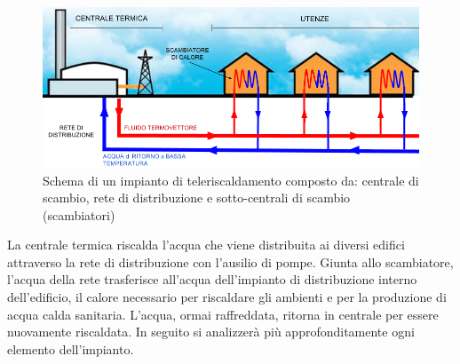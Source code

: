 \documentclass[laurea,oneside,11pt]{USiena_tesiLM}
\begin{document}
\begin{figure}[h]
\begin{center}
\includegraphics[width=1.0\textwidth]{figure/schema_impianto1}
\caption{Schema di un impianto di teleriscaldamento composto da: centrale di scambio, rete di distribuzione e sotto-centrali di scambio (scambiatori)}
\label{fig:schema1}
\end{center}
\end{figure}

La centrale termica riscalda l'acqua che viene distribuita ai diversi edifici attraverso la rete di distribuzione con l'ausilio di pompe. Giunta allo scambiatore, l'acqua della rete trasferisce all'acqua dell'impianto di distribuzione interno dell'edificio, il calore necessario per riscaldare gli ambienti e per la produzione di acqua calda sanitaria. L'acqua, ormai raffreddata, ritorna in centrale per essere nuovamente riscaldata. 
In seguito si analizzerà più approfonditamente ogni elemento dell'impianto.
\end{document}
